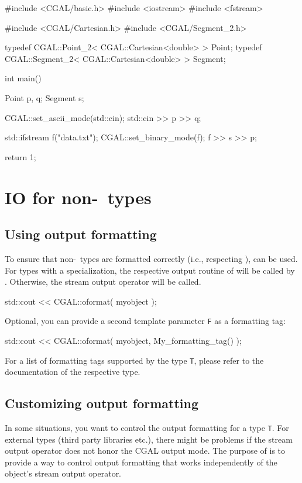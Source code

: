 \begin{ccExampleCode}

#include <CGAL/basic.h>
#include <iostream>
#include <fstream>

#include <CGAL/Cartesian.h>
#include <CGAL/Segment_2.h>

typedef CGAL::Point_2< CGAL::Cartesian<double> >     Point;
typedef CGAL::Segment_2< CGAL::Cartesian<double> >   Segment;

int
main()
{
    Point p, q;
    Segment s;

    CGAL::set_ascii_mode(std::cin);
    std::cin >> p >> q;

    std::ifstream f("data.txt");
    CGAL::set_binary_mode(f);
    f >> s >> p;

    return 1;
}
\end{ccExampleCode}

\section{IO for non-\cgal\ types\label{sec:iofornoncgaltypes}}


\subsection{Using output formatting}
To ensure that non-\cgal\ types are formatted correctly (i.e., respecting ),  can be used. For types with a  specialization, the respective output routine of  will be called by . Otherwise, the stream output operator will be called.

\ccExample
\begin{ccExampleCode}
std::cout << CGAL::oformat( myobject );
\end{ccExampleCode}

Optional, you can provide a second template parameter \texttt{F} as a formatting tag:

\ccExample
\begin{ccExampleCode}
std::cout << CGAL::oformat( myobject, My_formatting_tag() );
\end{ccExampleCode}

For a list of formatting tags supported by the type \texttt{T}, please refer to the documentation of the respective type.

\subsection{Customizing output formatting}
In some situations, you want to control the output formatting for a type \texttt{T}. For external types (third party libraries etc.), there might be problems if the stream output operator does not honor the CGAL output mode. The purpose of  is to provide a way to control output formatting that works independently of the object's stream output operator.

